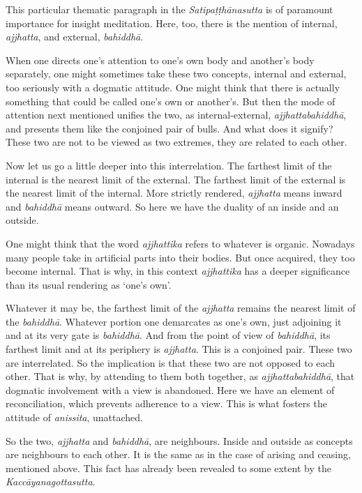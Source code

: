 This particular thematic paragraph in the \emph{Satipaṭṭhānasutta} is of paramount importance for insight meditation. Here, too, there is the mention of internal, \emph{ajjhatta}, and external, \emph{bahiddhā}.

When one directs one's attention to one's own body and another's body separately, one might sometimes take these two concepts, internal and external, too seriously with a dogmatic attitude. One might think that there is actually something that could be called one's own or another's. But then the mode of attention next mentioned unifies the two, as internal-external, \emph{ajjhattabahiddhā}, and presents them like the conjoined pair of bulls. And what does it signify? These two are not to be viewed as two extremes, they are related to each other.

Now let us go a little deeper into this interrelation. The farthest limit of the internal is the nearest limit of the external. The farthest limit of the external is the nearest limit of the internal. More strictly rendered, \emph{ajjhatta} means inward and \emph{bahiddhā} means outward. So here we have the duality of an inside and an outside.

One might think that the word \emph{ajjhattika} refers to whatever is organic. Nowadays many people take in artificial parts into their bodies. But once acquired, they too become internal. That is why, in this context \emph{ajjhattika} has a deeper significance than its usual rendering as `one's own'.

Whatever it may be, the farthest limit of the \emph{ajjhatta} remains the nearest limit of the \emph{bahiddhā}. Whatever portion one demarcates as one's own, just adjoining it and at its very gate is \emph{bahiddhā}. And from the point of view of \emph{bahiddhā}, its farthest limit and at its periphery is \emph{ajjhatta}. This is a conjoined pair. These two are interrelated. So the implication is that these two are not opposed to each other. That is why, by attending to them both together, as \emph{ajjhattabahiddhā}, that dogmatic involvement with a view is abandoned. Here we have an element of reconciliation, which prevents adherence to a view. This is what fosters the attitude of \emph{anissita}, unattached.

So the two, \emph{ajjhatta} and \emph{bahiddhā}, are neighbours. Inside and outside as concepts are neighbours to each other. It is the same as in the case of arising and ceasing, mentioned above. This fact has already been revealed to some extent by the \emph{Kaccāyanagottasutta}.

